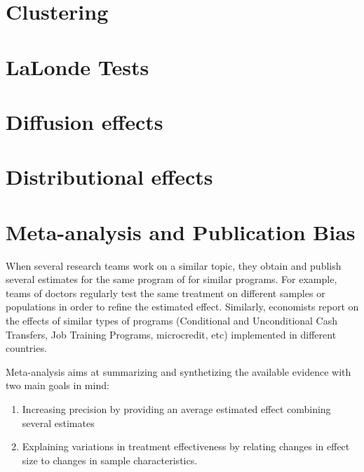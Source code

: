 \documentclass[
]{book}
\providecommand{\tightlist}{%
  \setlength{\itemsep}{0pt}\setlength{\parskip}{0pt}}
\theoremstyle{definition}
\theoremstyle{definition}
\theoremstyle{definition}
\theoremstyle{definition}
\theoremstyle{remark}
\begin{document}
\hypertarget{cluster}{%
\chapter{Clustering}\label{cluster}}

\hypertarget{LaLonde}{%
\chapter{LaLonde Tests}\label{LaLonde}}

\hypertarget{Diffusion}{%
\chapter{Diffusion effects}\label{Diffusion}}

\hypertarget{Distribution}{%
\chapter{Distributional effects}\label{Distribution}}

\hypertarget{sec:meta}{%
\chapter{Meta-analysis and Publication Bias}\label{sec:meta}}

When several research teams work on a similar topic, they obtain and publish several estimates for the same program of for similar programs.
For example, teams of doctors regularly test the same treatment on different samples or populations in order to refine the estimated effect.
Similarly, economists report on the effects of similar types of programs (Conditional and Unconditional Cash Transfers, Job Training Programs, microcredit, etc) implemented in different countries.

Meta-analysis aims at summarizing and synthetizing the available evidence with two main goals in mind:

\begin{enumerate}
\def\labelenumi{\arabic{enumi}.}
\tightlist
\item
  Increasing precision by providing an average estimated effect combining several estimates
\item
  Explaining variations in treatment effectiveness by relating changes in effect size to changes in sample characteristics.
\end{enumerate}
\end{document}
